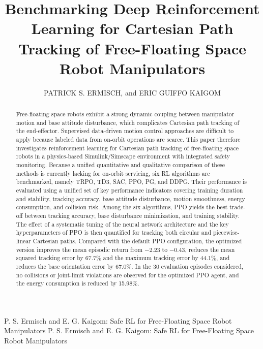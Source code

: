 \documentclass{ieeeaccess}
\begin{document}

\title{Benchmarking Deep Reinforcement Learning for Cartesian Path Tracking of Free-Floating Space Robot Manipulators}
\author{\uppercase{Patrick S. Ermisch}, and 
\uppercase{Eric Guiffo Kaigom} }
\address[1]{Department of Computer Science \& Engineering, Frankfurt University of Applied Sciences, Frankfurt am Main, Germany \\(e-mail: steven.ermisch@stud.fra-uas.de, kaigom@fra-uas.de)}

\markboth
{P. S. Ermisch and E. G. Kaigom: Safe RL for Free-Floating Space Robot Manipulators}
{P. S. Ermisch and E. G. Kaigom: Safe RL for Free-Floating Space Robot Manipulators}


\begin{abstract}
Free-floating space robots exhibit a strong dynamic coupling between manipulator motion and base attitude
disturbance,
which complicates Cartesian path tracking of the end-effector.
Supervised data-driven motion control approaches are difficult to apply because labeled data from on-orbit 
operations are scarce. This paper therefore investigates reinforcement learning for Cartesian path tracking 
of free-floating space robots in a physics-based Simulink/Simscape environment with integrated safety monitoring. 
Because a unified quantitative and qualitative comparison of these methods is currently lacking for
on-orbit 
servicing, six RL algorithms are benchmarked, namely TRPO, TD3, SAC, PPO, PG, and DDPG.
Their performance is evaluated
using a unified set of key performance indicators covering training duration and stability, tracking 
accuracy, base attitude disturbance, motion smoothness, energy consumption, and collision risk. Among the six 
algorithms, PPO yields the best trade-off between tracking accuracy, base disturbance minimization, and training
stability.
The effect of a systematic tuning of the neural network architecture and the key
hyperparameters of PPO is then 
quantified for tracking both circular and piecewise-linear Cartesian paths.
Compared with the default PPO configuration, the optimized version improves the mean episodic return 
from $-2.23$ to $-0.43$, reduces the mean squared tracking error by 67.7\% and the
maximum tracking error by 
44.1\%, and reduces the base orientation error by 67.0\%. In the 30 evaluation episodes
considered, no 
collisions or joint-limit violations are observed for the optimized PPO agent, and the energy
consumption is 
reduced by 15.98\%.
\end{abstract}
\end{document}
